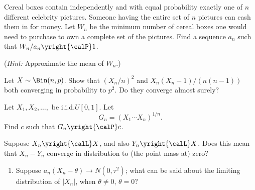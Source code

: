 \begin{problem}
  Cereal boxes contain independently and with equal probability exactly one
  of \(n\) different celebrity pictures. Someone having the entire set of
  \(n\) pictures can cash them in for money. Let \(W_n\) be the minimum
  number of cereal boxes one would need to purchase to own a complete set
  of the pictures. Find a sequence \(a_n\) such that
  \(W_n/a_n\yright{\calP} 1\).

  \noindent (\emph{Hint:} Approximate the mean of \(W_n\).)
\end{problem}
\begin{solution}

\end{solution}
\newpage

\begin{problem}[DasGupta 7.17]
  Let \(X\sim\Bin(n,p)\). Show that \((X_n/n)^2\) and
  \(X_n(X_n-1)/(n(n-1))\) both converging in probability to \(p^2\). Do
  they converge almost surely?
\end{problem}
\begin{solution}

\end{solution}
\newpage

\begin{problem}[DasGupta 7.21]
  Let \(X_1,X_2,\dotsc,\) be i.i.d.\@ \(U[0,1]\). Let
  \[
    G_n=(X_1\dotsm X_n)^{1/n}.
  \]
  Find \(c\) such that \(G_n\yright{\calP} c\).
\end{problem}
\begin{solution}

\end{solution}
\newpage

\begin{problem}
  Suppose \(X_n\yright{\calL}X\), and also \(Y_n\yright{\calL} X\). Does
  this mean that \(X_n-Y_n\) converge in distribution to (the point mass
  at) zero?
\end{problem}
\begin{solution}

\end{solution}
\newpage

\begin{problem}[DasGupta 7.31 (a)]
  \begin{enumerate}[label=(\alph*),noitemsep]
  \item Suppose \(a_n(X_n-\theta)\to N(0,\tau^2)\); what can be said
    about the limiting distribution of \(|X_n|\), when \(\theta\neq 0\),
    \(\theta=0\)?
  \end{enumerate}
\end{problem}
\begin{solution}

\end{solution}

